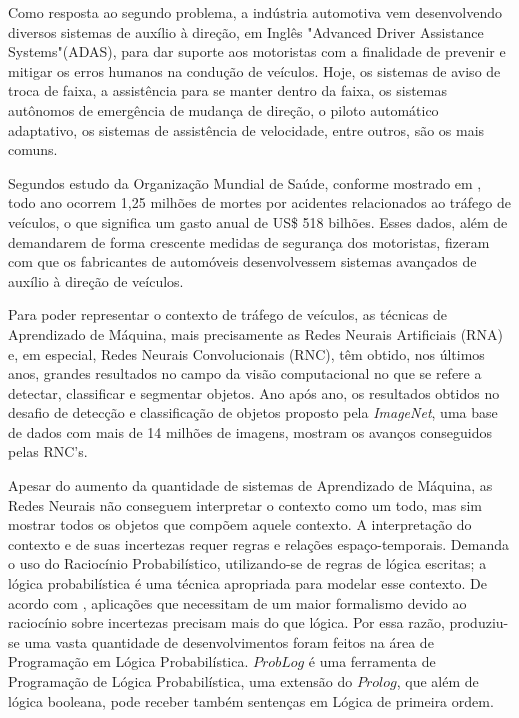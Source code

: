 \documentclass[
	12pt,				%
    oneside,			%
	a4paper,			%
	english,			%
	french,				%
	spanish,			%
	brazil,				%
	]{abntex2}
\begin{document}
Como resposta ao segundo problema, a indústria automotiva vem desenvolvendo diversos sistemas de auxílio à direção, em Inglês "Advanced Driver Assistance Systems"(ADAS), para dar suporte aos motoristas com a finalidade de prevenir e mitigar os erros humanos na condução de veículos. Hoje, os sistemas de aviso de troca de faixa, a assistência para se manter dentro da faixa, os sistemas autônomos de emergência de mudança de direção, o  piloto automático adaptativo, os  sistemas de assistência de velocidade, entre outros, são os mais comuns.

Segundos estudo da Organização Mundial de Saúde, conforme mostrado em , todo ano ocorrem 1,25 milhões de mortes por acidentes relacionados ao tráfego de veículos, o que significa um gasto anual de US\$ 518 bilhões. Esses dados, além de demandarem de forma crescente medidas de segurança dos motoristas, fizeram com que os fabricantes de automóveis desenvolvessem sistemas avançados de auxílio à direção de veículos. 

Para poder representar o contexto de tráfego de veículos, as técnicas de Aprendizado de Máquina, mais precisamente as Redes Neurais Artificiais (RNA) e, em especial, Redes Neurais Convolucionais (RNC), têm obtido, nos últimos anos,  grandes resultados no campo da visão computacional no que se refere a detectar, classificar e segmentar objetos. Ano após ano, os resultados obtidos no desafio de detecção e classificação de objetos proposto pela \textit{ImageNet}, uma base de dados com mais de 14 milhões de imagens, mostram os avanços conseguidos pelas RNC's.

Apesar do aumento da quantidade de sistemas de Aprendizado de Máquina, as Redes Neurais não conseguem interpretar o contexto como um todo, mas sim mostrar todos os objetos que compõem aquele contexto. A interpretação do contexto e de suas incertezas requer regras e relações espaço-temporais. Demanda o uso do Raciocínio Probabilístico, utilizando-se de regras de lógica escritas; a lógica probabilística é uma técnica apropriada para modelar esse contexto. De acordo com , aplicações que necessitam de um maior formalismo devido ao raciocínio sobre incertezas precisam mais do que lógica. Por essa razão, produziu-se uma vasta quantidade de desenvolvimentos foram feitos na área de Programação em Lógica Probabilística. $ProbLog$ é uma ferramenta de Programação de Lógica Probabilística, uma extensão do $Prolog$, que além de lógica booleana, pode receber também sentenças em Lógica de primeira ordem.
\end{document}
